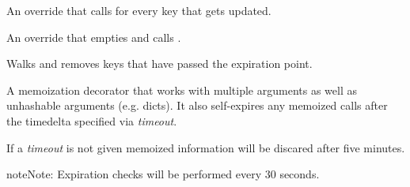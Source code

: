 \documentclass[letterpaper,10pt,openany]{sphinxmanual}
\begin{document}
\begin{fulllineitems}
\begin{fulllineitems}
\end{fulllineitems}


\begin{fulllineitems}
\label{Developer/utils:gateone.core.utils.AutoExpireDict.update}
An override that calls  for every key that gets updated.

\end{fulllineitems}


\begin{fulllineitems}
\label{Developer/utils:gateone.core.utils.AutoExpireDict.clear}
An override that empties  and calls
.

\end{fulllineitems}


\begin{fulllineitems}
\label{Developer/utils:gateone.core.utils.AutoExpireDict._timeout_checker}
Walks  and removes keys that have passed the expiration point.

\end{fulllineitems}


\end{fulllineitems}


\begin{fulllineitems}
\label{Developer/utils:gateone.core.utils.memoize}
A memoization decorator that works with multiple arguments as well as
unhashable arguments (e.g. dicts).  It also self-expires any memoized
calls after the timedelta specified via \emph{timeout}.

If a \emph{timeout} is not given memoized information will be discared after five
minutes.

\begin{notice}{note}{Note:}
Expiration checks will be performed every 30 seconds.
\end{notice}

\end{fulllineitems}
\end{document}
